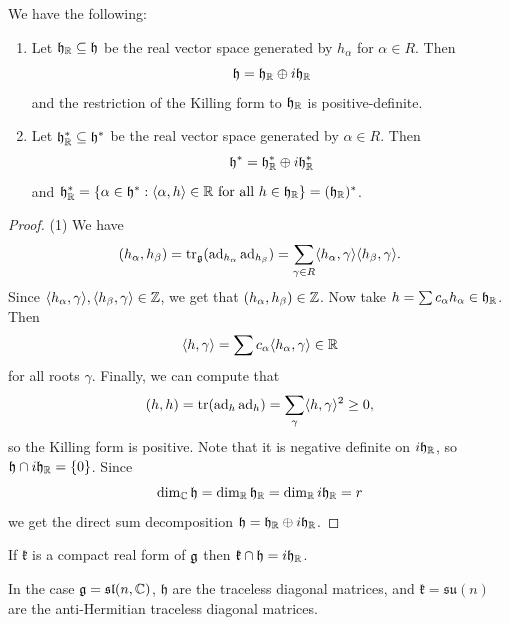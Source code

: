 \begin{theorem}
  We have the following:
  \begin{enumerate}
    \item Let $\mathfrak{h}_{\mathbb{R}} \subseteq \mathfrak{h}$
      be the real vector space generated
      by $h_\alpha$ for $\alpha \in R$.
      Then
      \[
        \mathfrak{h}
        = \mathfrak{h}_{\mathbb{R}}
        \oplus i \mathfrak{h}_{\mathbb{R}}
      \]
      and the restriction of the Killing
      form to $\mathfrak{h}_{\mathbb{R}}$ is
      positive-definite.
    \item Let $\mathfrak{h}_{\mathbb{R}}^* \subseteq \mathfrak{h}^*$
      be the real vector space generated by
      $\alpha \in R$. Then
      \[
        \mathfrak{h}^*
        = \mathfrak{h}_{\mathbb{R}}^*
        \oplus i \mathfrak{h}_{\mathbb{R}}^*
      \]
      and $\mathfrak{h}_{\mathbb{R}}^* = \{ \alpha \in \mathfrak{h}^* : \langle \alpha, h \rangle \in \mathbb{R} \text{ for all } h \in \mathfrak{h}_{\mathbb{R}} \} = (\mathfrak{h}_{\mathbb{R}})^*$.
  \end{enumerate}
\end{theorem}

\begin{proof}
  (1) We have
  \[
    (h_\alpha, h_\beta)
    = \operatorname{tr}_{\mathfrak{g}}(\operatorname{ad}_{h_\alpha} \operatorname{ad}_{h_\beta})
    = \sum_{\gamma \in R} \langle h_\alpha, \gamma \rangle \langle h_\beta, \gamma \rangle.
  \]
  Since $\langle h_\alpha, \gamma \rangle, \langle h_\beta, \gamma \rangle \in \mathbb{Z}$,
  we get that
  $(h_\alpha, h_\beta) \in \mathbb{Z}$. Now take
  $h = \sum c_\alpha h_\alpha \in \mathfrak{h}_{\mathbb{R}}$.
  Then
  \[
    \langle h, \gamma \rangle
    = \sum c_\alpha \langle h_\alpha, \gamma \rangle \in \mathbb{R}
  \]
  for all roots $\gamma$. Finally, we
  can compute that
  \[
    (h, h)
    = \operatorname{tr}(\operatorname{ad}_h \operatorname{ad}_h)
    = \sum_\gamma \langle h, \gamma \rangle^2 \ge 0,
  \]
  so the Killing form is positive.
  Note that it is negative definite on
  $i \mathfrak{h}_{\mathbb{R}}$, so
  $\mathfrak{h} \cap i \mathfrak{h}_{\mathbb{R}} = \{0\}$.
  Since
  \[
    \dim_{\mathbb{C}} \mathfrak{h}
    = \dim_{\mathbb{R}} \mathfrak{h}_{\mathbb{R}}
    =
    \dim_{\mathbb{R}} i \mathfrak{h}_{\mathbb{R}}
    = r
  \]
  we get the direct sum decomposition
  $\mathfrak{h} = \mathfrak{h}_{\mathbb{R}} \oplus i \mathfrak{h}_{\mathbb{R}}$.
\end{proof}

\begin{remark}
  If $\mathfrak{k}$ is a compact real form
  of $\mathfrak{g}$ then $\mathfrak{k} \cap \mathfrak{h} = i \mathfrak{h}_{\mathbb{R}}$.
\end{remark}

\begin{example}
  In the case $\mathfrak{g} = \mathfrak{sl}(n, \mathbb{C})$,
  $\mathfrak{h}$ are the traceless
  diagonal matrices, and
  $\mathfrak{k} = \mathfrak{su}(n)$
  are the anti-Hermitian traceless
  diagonal matrices.
\end{example}

